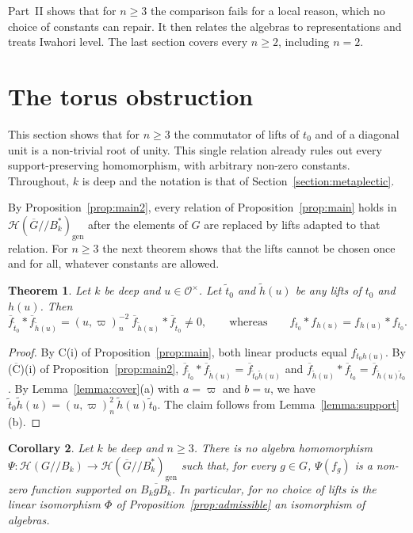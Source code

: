 \documentclass[12pt,letterpaper]{amsart}
\numberwithin{equation}{section}
\newtheorem{theorem}{Theorem}[section]
\newtheorem{corollary}[theorem]{Corollary}
\theoremstyle{definition}
\theoremstyle{remark}
\newcommand{\cO}{\mathcal{O}}
\newcommand{\cH}{\mathcal{H}}
\newcommand{\Gbar}{\overline{G}}
\newcommand{\gen}{\mathrm{gen}}
\newcommand{\fbar}{\overline{f}}
\newcommand{\Hgen}{\cH(\Gbar/\!/B_k^*)_{\gen}}
\newcommand{\Hlin}{\cH(G/\!/B_k)}
\begin{document}
Part~II shows that for $n\geq 3$ the comparison fails for a local
reason, which no choice of constants can repair. It then relates the
algebras to representations and treats Iwahori level. The last section
covers every $n\geq 2$, including $n=2$.

\section{The torus obstruction}
\label{section:torus}

This section shows that for $n\geq 3$ the commutator of lifts of $t_0$
and of a diagonal unit is a non-trivial root of unity. This single
relation already rules out every support-preserving homomorphism, with
arbitrary non-zero constants. Throughout, $k$ is deep and the notation
is that of Section~\ref{section:metaplectic}.

By Proposition~\ref{prop:main2}, every relation of
Proposition~\ref{prop:main} holds in $\Hgen$ after the elements of $G$
are replaced by lifts adapted to that relation. For $n\geq 3$ the next
theorem shows that the lifts cannot be chosen once and for all, whatever
constants are allowed.

\begin{theorem}
\label{thrm:main}
Let $k$ be deep and $u\in\cO^\times$. Let $\tilde t_0$ and
$\tilde h(u)$ be any lifts of $t_0$ and $h(u)$. Then
\[
\fbar_{\tilde t_0}*\fbar_{\tilde h(u)}
=(u,\varpi)_n^{-2}\ \fbar_{\tilde h(u)}*\fbar_{\tilde t_0}\neq 0,
\qquad\mbox{whereas}\qquad
f_{t_0}*f_{h(u)}=f_{h(u)}*f_{t_0}.
\]
\end{theorem}

\begin{proof}
By C(i) of Proposition~\ref{prop:main}, both linear products equal
$f_{t_0h(u)}$. By ($\overline{\mbox{C}}$)(i) of
Proposition~\ref{prop:main2},
$\fbar_{\tilde t_0}*\fbar_{\tilde h(u)}=\fbar_{\tilde t_0\tilde h(u)}$
and
$\fbar_{\tilde h(u)}*\fbar_{\tilde t_0}=\fbar_{\tilde h(u)\tilde t_0}$.
By Lemma~\ref{lemma:cover}(a) with $a=\varpi$ and $b=u$, we have
$\tilde t_0\tilde h(u)=(u,\varpi)_n^2\,\tilde h(u)\tilde t_0$. The
claim follows from Lemma~\ref{lemma:support}(b).
\end{proof}

\begin{corollary}
\label{corollary:main}
Let $k$ be deep and $n\geq 3$. There is no algebra homomorphism
$\Psi:\Hlin\to\Hgen$ such that, for every $g\in G$, $\Psi(f_g)$ is a
non-zero function supported on $\overline{B_kgB_k}$. In particular, for
no choice of lifts is the linear isomorphism $\Phi$ of
Proposition~\ref{prop:admissible} an isomorphism of algebras.
\end{corollary}
\end{document}
